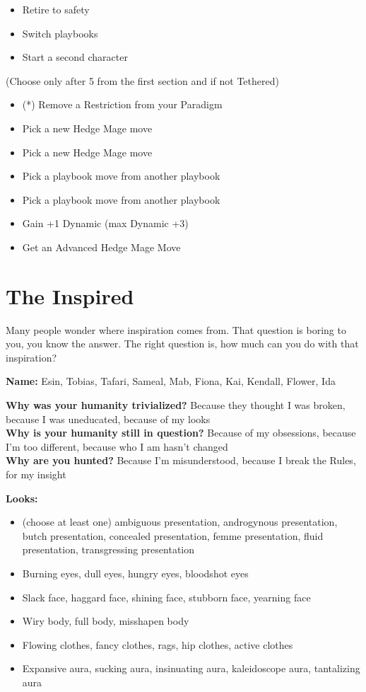 \documentclass[
  oneside,
  statementpaper,
  9pt]{memoir}
\begin{document}
\begin{itemize}
\tightlist
\item
  Retire to safety
\item
  Switch playbooks
\item
  Start a second character
\end{itemize}

(Choose only after 5 from the first section and if not Tethered)

\begin{itemize}
\tightlist
\item
  (*) Remove a Restriction from your Paradigm
\item
  Pick a new Hedge Mage move
\item
  Pick a new Hedge Mage move
\item
  Pick a playbook move from another playbook
\item
  Pick a playbook move from another playbook
\item
  Gain +1 Dynamic (max Dynamic +3)
\item
  Get an Advanced Hedge Mage Move
\end{itemize}

\newpage

\hypertarget{the-inspired}{%
\section{The Inspired}\label{the-inspired}}

Many people wonder where inspiration comes from. That question is boring
to you, you know the answer. The right question is, how much can you do
with that inspiration?

\textbf{Name:} Esin, Tobias, Tafari, Sameal, Mab, Fiona, Kai, Kendall,
Flower, Ida

\textbf{Why was your humanity trivialized?} Because they thought I was
broken, because I was uneducated, because of my looks\\
\textbf{Why is your humanity still in question?} Because of my
obsessions, because I'm too different, because who I am hasn't changed\\
\textbf{Why are you hunted?} Because I'm misunderstood, because I break
the Rules, for my insight

\textbf{Looks:}

\begin{itemize}
\tightlist
\item
  (choose at least one) ambiguous presentation, androgynous
  presentation, butch presentation, concealed presentation, femme
  presentation, fluid presentation, transgressing presentation
\item
  Burning eyes, dull eyes, hungry eyes, bloodshot eyes
\item
  Slack face, haggard face, shining face, stubborn face, yearning face
\item
  Wiry body, full body, misshapen body
\item
  Flowing clothes, fancy clothes, rags, hip clothes, active clothes
\item
  Expansive aura, sucking aura, insinuating aura, kaleidoscope aura,
  tantalizing aura
\end{itemize}
\end{document}
